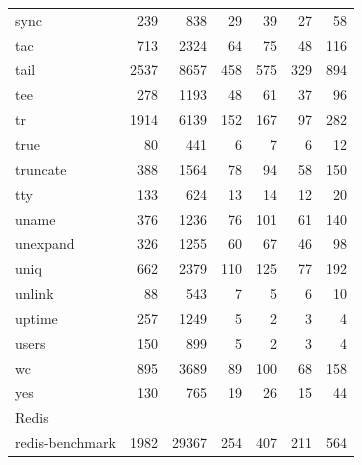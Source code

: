{\begin{longtable}{lrrrrrr}
    sync            & 239        & 838      & 29              & 39              & 27             & 58       \\
    tac             & 713        & 2324     & 64              & 75              & 48             & 116      \\
    tail            & 2537       & 8657     & 458             & 575             & 329            & 894      \\
    tee             & 278        & 1193     & 48              & 61              & 37             & 96       \\
    tr              & 1914       & 6139     & 152             & 167             & 97             & 282      \\
    true            & 80         & 441      & 6               & 7               & 6              & 12       \\
    truncate        & 388        & 1564     & 78              & 94              & 58             & 150      \\
    tty             & 133        & 624      & 13              & 14              & 12             & 20       \\
    uname           & 376        & 1236     & 76              & 101             & 61             & 140      \\
    unexpand        & 326        & 1255     & 60              & 67              & 46             & 98       \\
    uniq            & 662        & 2379     & 110             & 125             & 77             & 192      \\
    unlink          & 88         & 543      & 7               & 5               & 6              & 10       \\
    uptime          & 257        & 1249     & 5               & 2               & 3              & 4        \\
    users           & 150        & 899      & 5               & 2               & 3              & 4        \\
    wc              & 895        & 3689     & 89              & 100             & 68             & 158      \\
    yes             & 130        & 765      & 19              & 26              & 15             & 44       \\
    \midrule 
    \multicolumn{7}{l}{Redis} \\
    \midrule 
    redis-benchmark & 1982       & 29367    & 254             & 407             & 211            & 564       \\

\end{longtable}}

